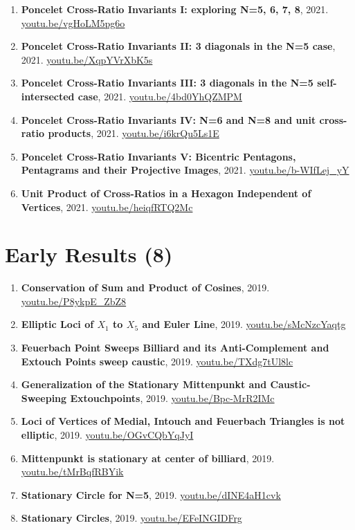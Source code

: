 \documentclass[12pt]{article}
\begin{document}
\begin{enumerate}[resume]
\item \textbf{Poncelet Cross-Ratio Invariants I: exploring N=5, 6, 7, 8}, 2021. \href{https://youtu.be/vgHoLM5pg6o}{\url{youtu.be/vgHoLM5pg6o}}
\item \textbf{Poncelet Cross-Ratio Invariants II: 3 diagonals in the N=5 case}, 2021. \href{https://youtu.be/XqpYVrXbK5s}{\url{youtu.be/XqpYVrXbK5s}}
\item \textbf{Poncelet Cross-Ratio Invariants III: 3 diagonals in the N=5 self-intersected case}, 2021. \href{https://youtu.be/4bd0YhQZMPM}{\url{youtu.be/4bd0YhQZMPM}}
\item \textbf{Poncelet Cross-Ratio Invariants IV: N=6 and N=8 and unit cross-ratio products}, 2021. \href{https://youtu.be/i6krQu5Ls1E}{\url{youtu.be/i6krQu5Ls1E}}
\item \textbf{Poncelet Cross-Ratio Invariants V: Bicentric Pentagons, Pentagrams and their Projective Images}, 2021. \href{https://youtu.be/b-WIfLej_yY}{\url{youtu.be/b-WIfLej\_yY}}
\item \textbf{Unit Product of Cross-Ratios in a Hexagon Independent of Vertices}, 2021. \href{https://youtu.be/heiqfRTQ2Mc}{\url{youtu.be/heiqfRTQ2Mc}}
\end{enumerate}

\section{Early Results (8)}

\begin{enumerate}[resume]
\item \textbf{Conservation of Sum and Product of Cosines}, 2019. \href{https://youtu.be/P8ykpE_ZbZ8}{\url{youtu.be/P8ykpE\_ZbZ8}}
\item \textbf{Elliptic Loci of $X_{1}$ to $X_{5}$ and Euler Line}, 2019. \href{https://youtu.be/sMcNzcYaqtg}{\url{youtu.be/sMcNzcYaqtg}}
\item \textbf{Feuerbach Point Sweeps Billiard and its Anti-Complement and Extouch Points sweep caustic}, 2019. \href{https://youtu.be/TXdg7tUl8lc}{\url{youtu.be/TXdg7tUl8lc}}
\item \textbf{Generalization of the Stationary Mittenpunkt and Caustic-Sweeping Extouchpoints}, 2019. \href{https://youtu.be/Bpc-MrR2IMc}{\url{youtu.be/Bpc-MrR2IMc}}
\item \textbf{Loci of Vertices of Medial, Intouch and Feuerbach Triangles is not elliptic}, 2019. \href{https://youtu.be/OGvCQbYqJyI}{\url{youtu.be/OGvCQbYqJyI}}
\item \textbf{Mittenpunkt is stationary at center of billiard}, 2019. \href{https://youtu.be/tMrBqfRBYik}{\url{youtu.be/tMrBqfRBYik}}
\item \textbf{Stationary Circle for N=5}, 2019. \href{https://youtu.be/dINE4aH1cvk}{\url{youtu.be/dINE4aH1cvk}}
\item \textbf{Stationary Circles}, 2019. \href{https://youtu.be/EFeINGIDFrg}{\url{youtu.be/EFeINGIDFrg}}
\end{enumerate}
\end{document}
